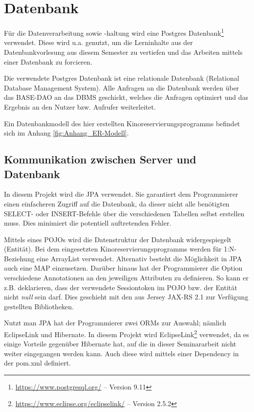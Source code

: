 \section{Datenbank}
\label{sec:datenbank}
\authorsection{\authorSG}

Für die Datenverarbeitung sowie -haltung wird eine Postgres Datenbank\footnote{\url{https://www.postgresql.org/} -- Version 9.11} verwendet.
Diese wird u.a. genutzt, um die Lerninhalte aus der Datenbankvorlesung aus diesem Semester zu vertiefen und das Arbeiten mittels einer Datenbank zu forcieren.

Die verwendete Postgres Datenbank ist eine relationale Datenbank (Relational Database Management System).
Alle Anfragen an die Datenbank werden über das BASE-\acs{DAO} an das \acs{DBMS} geschickt, welches die Anfragen optimiert und das Ergebnis an den Nutzer bzw. Aufrufer weiterleitet.

Ein Datenbankmodell des hier erstellten Kinoreservierungsprogramms befindet sich im Anhang \vref{fig:Anhang_ER-Modell}. 

\subsection{Kommunikation zwischen Server und Datenbank}
\label{ssec:jpa}
\authorsection{\authorSG}

In diesem Projekt wird die \ac{JPA} verwendet.
Sie garantiert dem Programmierer einen einfacheren Zugriff auf die Datenbank, da dieser nicht alle benötigten SELECT- oder INSERT-Befehle über die verschiedenen Tabellen selbst erstellen muss.
Dies minimiert die potentiell auftretenden Fehler.

Mittels eines \acp{POJO} wird die Datenstruktur der Datenbank widergespiegelt (Entität). Bei dem eingesetzten Kinoreservierungsprogramms werden für 1:N-Beziehung eine ArrayList verwendet.
Alternativ besteht die Möglichkeit in \ac{JPA} auch eine MAP einzusetzen.
Darüber hinaus hat der Programmierer die Option verschiedene Annotationen an den jeweiligen Attributen zu definieren.
So kann er z.B. deklarieren, dass der verwendete Sessiontoken im \ac{POJO} bzw. der Entität nicht \textit{null} sein darf.
Dies geschieht mit den aus Jersey JAX-RS 2.1 zur Verfügung gestellten Bibliotheken.

Nutzt man \ac{JPA} hat der Programmierer zwei \acp{ORM} zur Auswahl; nämlich EclipseLink und Hibernate.
In diesem Projekt wird EclipseLink\footnote{\url{https://www.eclipse.org/eclipselink/} -- Version 2.5.2} verwendet, da es einige Vorteile gegenüber Hibernate hat, auf die in dieser Seminararbeit nicht weiter eingegangen werden kann.
Auch diese wird mittels einer Dependency in der pom.xml definiert.

